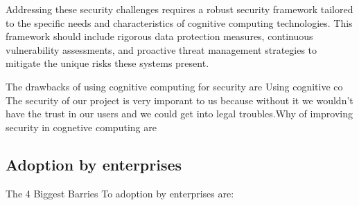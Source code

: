 \documentclass{article}
\begin{document}
Addressing these security challenges requires a robust security framework tailored to the specific needs and characteristics of cognitive computing technologies. This framework should include rigorous data protection measures, continuous vulnerability assessments, and proactive threat management strategies to mitigate the unique risks these systems present.

The drawbacks of using cognitive computing for security are 
Using cognitive co
The security of our project is very imporant to us because without it we wouldn't have the trust in our users and we could get into legal troubles.Why of improving security in cognetive computing are

\subsection{Adoption by enterprises}
The 4 Biggest Barries To adoption by enterprises are:
\end{document}
